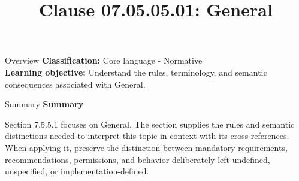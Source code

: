 \documentclass[10pt,letterpaper]{article}
\title{Clause 07.05.05.01: General}
\author{}
\date{}
\begin{document}
\maketitle
\begin{CornellOverviewBox}{Overview}
\textbf{Classification:} Core language - Normative\\[2pt]
\textbf{Learning objective:} Understand the rules, terminology, and semantic consequences associated with General.
\end{CornellOverviewBox}\begin{CornellSummaryBox}{Summary}
{\sffamily\bfseries\color{Accent} Summary}\par\vspace{3pt}Section 7.5.5.1 focuses on General. The section supplies the rules and semantic distinctions needed to interpret this topic in context with its cross-references. When applying it, preserve the distinction between mandatory requirements, recommendations, permissions, and behavior deliberately left undefined, unspecified, or implementation-defined.
\end{CornellSummaryBox}
\end{document}
